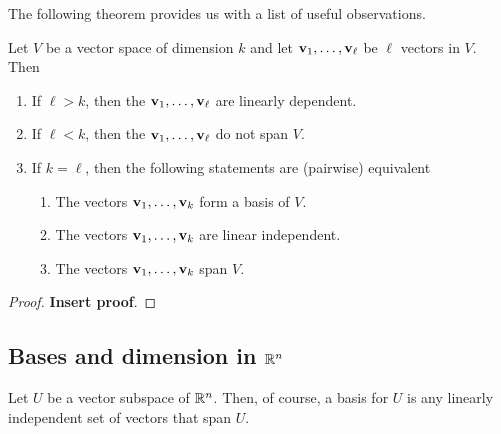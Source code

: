 \documentclass[10pt, a4paper]{article}
\begin{document}
The following theorem provides us with a list of useful observations.
\begin{theorem}
    Let $V$ be a vector space of dimension $k$ and let $\mathbf{v}_1, \dotsc, \mathbf{v}_{\ell}$ be $\ell$ vectors in $V$.
    Then
    \begin{enumerate}[label = (\roman*)]
        \item If $\ell > k$,
        then the $\mathbf{v}_1, \dotsc, \mathbf{v}_{\ell}$ are linearly dependent.
        \item If $\ell < k$,
        then the $\mathbf{v}_1, \dotsc, \mathbf{v}_{\ell}$ do not span $V$.
        \item If $k = \ell$,
        then the following statements are (pairwise) equivalent
        \begin{enumerate}[label = (\alph*)]
            \item The vectors $\mathbf{v}_1, \dotsc, \mathbf{v}_k$ form a basis of $V$.
            \item The vectors $\mathbf{v}_1, \dotsc, \mathbf{v}_k$ are linear independent.
            \item The vectors $\mathbf{v}_1, \dotsc, \mathbf{v}_k$ span $V$.
        \end{enumerate}
    \end{enumerate}
    \begin{proof}
        \textbf{Insert proof}.
    \end{proof}
\end{theorem}

\subsection{Bases and dimension in \texorpdfstring{$\mathbb{R} ^ n$}{}}
\begin{remark}
    Let $U$ be a vector subspace of $\mathbb{R} ^ n$.
    Then,
    of course,
    a basis for $U$ is any linearly independent set of vectors that span $U$.
\end{remark}
\end{document}
